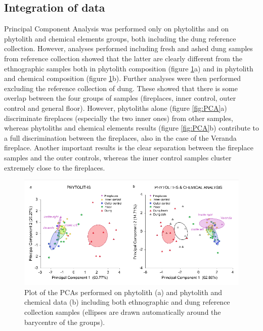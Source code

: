 \documentclass[authoryear,preprint,review,12pt]{elsarticle}
\begin{document}
\subsection{Integration of data}
\label{subsec:3.3}	
Principal Component Analysis was performed only on phytoliths and on phytolith and chemical elements groups, both including the dung reference collection. However, analyses performed including fresh and ashed dung samples from reference collection showed that the latter are clearly different from the ethnographic samples both in phytolith composition (figure \ref{fig:dungPCA}a) and in phytolith and chemical composition (figure \ref{fig:dungPCA}b). Further analyses were then performed excluding the reference collection of dung. These showed that there is some overlap between the four groups of samples (fireplaces, inner control, outer control and general floor). However, phytoliths alone (figure \ref{fig:PCA}a) discriminate fireplaces (especially the two inner ones) from other samples, whereas phytoliths and chemical elements results (figure \ref{fig:PCA}b) contribute to a full discrimination between the fireplaces, also in the case of the Veranda fireplace. Another important results is the clear separation between the fireplace samples and the outer controls, whereas the inner control samples cluster extremely close to the fireplaces.

\begin{figure}[ht!]
  \begin{center}
    \includegraphics[width=15cm]{figures/PCA_dung}
    \caption{Plot of the PCAs performed on phytolith (a) and phytolith and chemical data (b) including both ethnographic and dung reference collection samples (ellipses are drawn automatically around the barycentre of the groups).}
    \label{fig:dungPCA}
  \end{center}
\end{figure}
\end{document}
